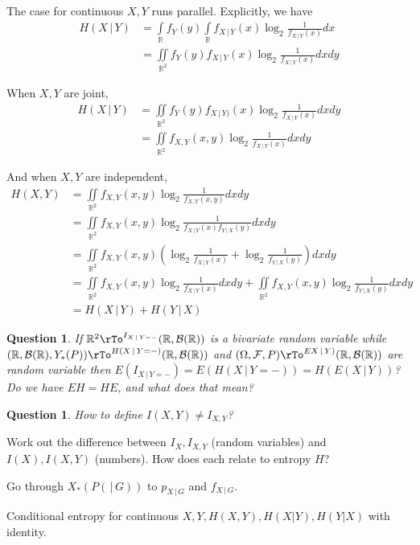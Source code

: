 \documentclass[12pt]{amsart}
\newtheorem{question}[theorem]{Question}
\theoremstyle{definition}
\begin{document}
The case for continuous $X, Y$ runs parallel. Explicitly, we have
\begin{align*}
H(X \,|\, Y) & = \int\limits_{\mathbb{R}} f_Y(y) \int\limits_{\mathbb{R}} f_{X \,|\, Y}(x) \log_2 \frac{1}{f_{X \,|\, Y}(x)} dx \\
 & = \iint\limits_{\mathbb{R}^2} f_Y(y) f_{X \,|\, Y}(x) \log_2 \frac{1}{f_{X \,|\, Y}(x)} dx dy
\end{align*}

When $X, Y$ are joint,
\begin{align*}
H(X \,|\, Y) & = \iint\limits_{\mathbb{R}^2} f_Y(y) f_{X \,|\, Y)}(x) \log_2 \frac{1}{f_{X \,|\, Y}(x)} dx dy \\
 & = \iint\limits_{\mathbb{R}^2} f_{X, Y}(x, y) \log_2 \frac{1}{f_{X \,|\, Y}(x)} dx dy
\end{align*}

And when $X, Y$ are independent,
\begin{align*}
H(X, Y) & = \iint\limits_{\mathbb{R}^2} f_{X, Y}(x, y) \log_2 \frac{1}{f_{X, Y}(x, y)} dx dy \\
 & = \iint\limits_{\mathbb{R}^2} f_{X, Y}(x, y) \log_2 \frac{1}{f_{X \,|\, Y}(x) f_{Y \,|\, X}(y)} dx dy \\
 & = \iint\limits_{\mathbb{R}^2} f_{X, Y}(x, y) \left( \log_2 \frac{1}{f_{X \,|\, Y}(x)} + \log_2 \frac{1}{f_{Y \,|\, X}(y)} \right) dx dy \\
 & = \iint\limits_{\mathbb{R}^2} f_{X, Y}(x, y) \log_2 \frac{1}{f_{X \,|\, Y}(x)} dx dy + \iint\limits_{\mathbb{R}^2} f_{X, Y}(x, y) \log_2 \frac{1}{f_{Y \,|\, X}(y)} dx dy \\
 & = H(X \,|\, Y) + H(Y \,|\, X)
\end{align*}

\begin{question} If $\mathbb{R}^2 \rTo^{I_{X \,|\, Y = -}} (\mathbb{R}, \mathcal{B}(\mathbb{R}))$ is a bivariate random variable while $(\mathbb{R}, \mathcal{B}(\mathbb{R}), Y_*(P)) \rTo^{H(X \,|\, Y = -)} (\mathbb{R}, \mathcal{B}(\mathbb{R}))$ and $(\Omega, \mathcal{F}, P) \rTo^{EX \,|\, Y)} (\mathbb{R}, \mathcal{B}(\mathbb{R}))$ are random variable then $E(I_{X \,|\, Y = -}) = E(H(X \,|\, Y = -)) = H(E(X \,|\, Y))$? Do we have $E H = HE$, and what does that mean?
\end{question}

\begin{question} How to define $I(X, Y) \neq I_{X, Y}$?
\end{question}

Work out the difference between $I_X, I_{X, Y}$ (random variables) and $I(X), I(X, Y)$ (numbers). How does each relate to entropy $H$?

Go through $X_*(P( \,|\, G))$ to $p_{X \,|\, G}$ and $f_{X \,|\, G}$.

Conditional entropy for continuous $X, Y, H(X, Y), H(X|Y), H(Y|X)$ with identity.

\newpage\noindent
\begin{bibdiv}
\begin{biblist}
\end{biblist}
\end{bibdiv}
\end{document}
